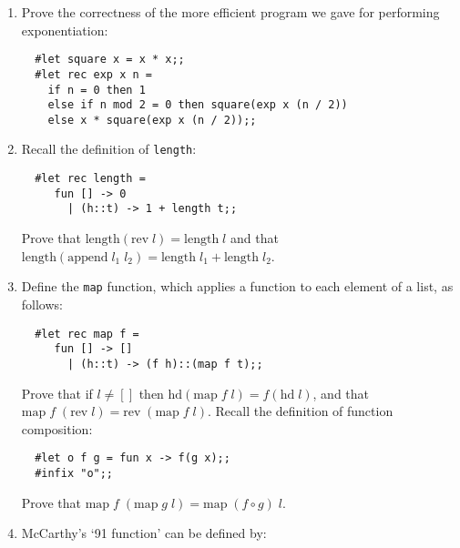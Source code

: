 \begin{enumerate}

\item Prove the correctness of the more efficient program we gave for
performing exponentiation:

\begin{boxed}\begin{verbatim}
  #let square x = x * x;;
  #let rec exp x n =
    if n = 0 then 1
    else if n mod 2 = 0 then square(exp x (n / 2))
    else x * square(exp x (n / 2));;
\end{verbatim}\end{boxed}

\item Recall the definition of {\tt length}:

\begin{boxed}\begin{verbatim}
  #let rec length =
     fun [] -> 0
       | (h::t) -> 1 + length t;;
\end{verbatim}\end{boxed}

Prove that $\mbox{length}(\mbox{rev}\; l) = \mbox{length}\; l$ and that
$\mbox{length}(\mbox{append}\; l_1\; l_2) = \mbox{length}\; l_1 +
\mbox{length}\; l_2$.

\item Define the {\tt map} function, which applies a function to each element
of a list, as follows:

\begin{boxed}\begin{verbatim}
  #let rec map f =
     fun [] -> []
       | (h::t) -> (f h)::(map f t);;
\end{verbatim}\end{boxed}

Prove that if $l \not= []$ then $\mbox{hd}(\mbox{map}\; f\; l) = f(\mbox{hd}\;
l)$, and that $\mbox{map}\; f\; (\mbox{rev}\; l) = \mbox{rev}\;
(\mbox{map}\; f\; l)$. Recall the definition of function composition:

\begin{boxed}\begin{verbatim}
  #let o f g = fun x -> f(g x);;
  #infix "o";;
\end{verbatim}\end{boxed}

Prove that $\mbox{map}\; f\; (\mbox{map}\; g\; l) = \mbox{map}\; (f \circ g)\;
l$.

\item McCarthy's `91 function' can be defined by:


\end{enumerate}

